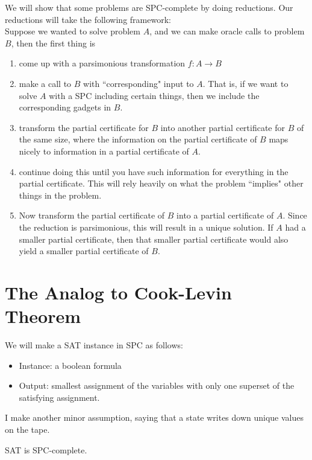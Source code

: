 \documentclass[runningheads,a4paper]{llncs}
\begin{document}
We will show that some problems are SPC-complete by doing reductions. Our reductions will take the following framework:\\
Suppose we wanted to solve problem $A$, and we can make oracle calls to problem $B$, then the first thing is
\begin{enumerate}
\item come up with a parsimonious transformation $f: A \rightarrow B$
\item make a call to $B$ with ``corresponding" input to $A$. That is, if we want to solve $A$ with a SPC including certain things, then we include the corresponding gadgets in $B$.
\item transform the partial certificate for $B$ into another partial certificate for $B$ of the same size, where the information on the partial certificate of $B$ maps nicely to information in a partial certificate of $A$.
\item continue doing this until you have such information for everything in the partial certificate. This will rely heavily on what the problem ``implies" other things in the problem.
\item Now transform the partial certificate of $B$ into a partial certificate of $A$. Since the reduction is parsimonious, this will result in a unique solution. If $A$ had a smaller partial certificate, then that smaller partial certificate would also yield a smaller partial certificate of $B$.
\end{enumerate}

\section{The Analog to Cook-Levin Theorem}

We will make a SAT instance in SPC as follows:
\begin{itemize}
\item Instance: a boolean formula
\item Output: smallest assignment of the variables with only one superset of the satisfying assignment.
\end{itemize}

I make another minor assumption, saying that a state writes down unique values on the tape. 

\begin{theorem}
SAT is SPC-complete.
\end{theorem}
\end{document}
